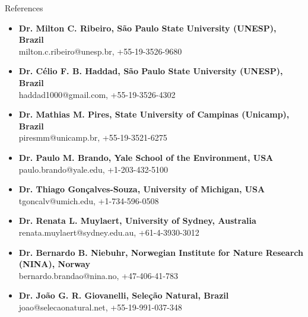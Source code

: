 \documentclass{resume}
\begin{document}
\begin{rSection}{References}
\begin{itemize}
\item \textbf{Dr. Milton C. Ribeiro, São Paulo State University (UNESP), Brazil}\\
milton.c.ribeiro@unesp.br, +55-19-3526-9680
\item \textbf{Dr. Célio F. B. Haddad, São Paulo State University (UNESP), Brazil}\\
haddad1000@gmail.com, +55-19-3526-4302
\item \textbf{Dr. Mathias M. Pires, State University of Campinas (Unicamp), Brazil}\\
piresmm@unicamp.br, +55-19-3521-6275
\item \textbf{Dr. Paulo M. Brando, Yale School of the Environment, USA}\\
paulo.brando@yale.edu, +1-203-432-5100
\item \textbf{Dr. Thiago Gonçalves-Souza, University of Michigan, USA}\\
tgoncalv@umich.edu, +1-734-596-0508
\item \textbf{Dr. Renata L. Muylaert, University of Sydney, Australia}\\
renata.muylaert@sydney.edu.au, +61-4-3930-3012
\item \textbf{Dr. Bernardo B. Niebuhr, Norwegian Institute for Nature Research (NINA), Norway}\\
bernardo.brandao@nina.no, +47-406-41-783
\item \textbf{Dr. João G. R. Giovanelli, Seleção Natural, Brazil}\\
joao@selecaonatural.net, +55-19-991-037-348
\end{itemize}
\end{rSection}
\end{document}
